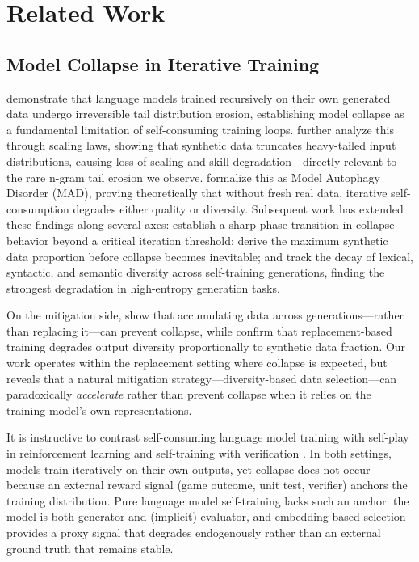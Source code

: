 \section{Related Work}

\subsection{Model Collapse in Iterative Training}

\citet{shumailov2024ai} demonstrate that language models trained recursively on their own generated data undergo irreversible tail distribution erosion, establishing model collapse as a fundamental limitation of self-consuming training loops. \citet{dohmatob2024tale} further analyze this through scaling laws, showing that synthetic data truncates heavy-tailed input distributions, causing loss of scaling and skill degradation---directly relevant to the rare n-gram tail erosion we observe. \citet{alemohammad2024self} formalize this as Model Autophagy Disorder (MAD), proving theoretically that without fresh real data, iterative self-consumption degrades either quality or diversity. Subsequent work has extended these findings along several axes: \citet{dohmatob2025strong} establish a sharp phase transition in collapse behavior beyond a critical iteration threshold; \citet{seddik2024how} derive the maximum synthetic data proportion before collapse becomes inevitable; and \citet{guo2024curious} track the decay of lexical, syntactic, and semantic diversity across self-training generations, finding the strongest degradation in high-entropy generation tasks.

On the mitigation side, \citet{gerstgrasser2024model} show that accumulating data across generations---rather than replacing it---can prevent collapse, while \citet{briesch2023large} confirm that replacement-based training degrades output diversity proportionally to synthetic data fraction. Our work operates within the replacement setting where collapse is expected, but reveals that a natural mitigation strategy---diversity-based data selection---can paradoxically \emph{accelerate} rather than prevent collapse when it relies on the training model's own representations.

It is instructive to contrast self-consuming language model training with self-play in reinforcement learning \citep{silver2017mastering} and self-training with verification \citep{singh2024beyond}. In both settings, models train iteratively on their own outputs, yet collapse does not occur---because an external reward signal (game outcome, unit test, verifier) anchors the training distribution. Pure language model self-training lacks such an anchor: the model is both generator and (implicit) evaluator, and embedding-based selection provides a proxy signal that degrades endogenously rather than an external ground truth that remains stable.

